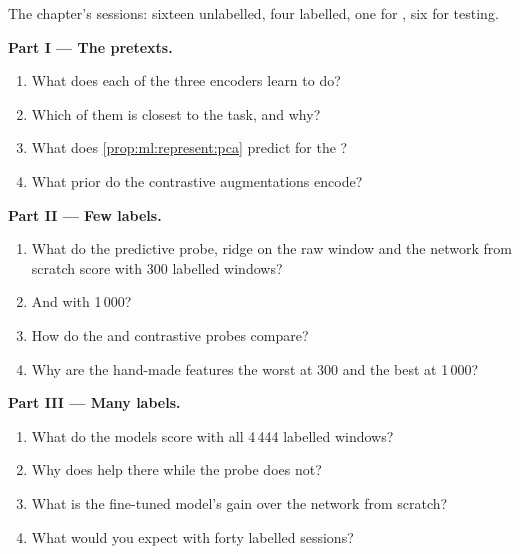 \begin{problem}\label{pb:ml:representation-learning:1}
The chapter's sessions: sixteen unlabelled, four labelled, one for , six for testing.

\medskip\noindent\textbf{Part I --- The pretexts.}
\begin{enumerate}
\item What does each of the three encoders learn to do?
\item Which of them is closest to the task, and why?
\item What does \cref{prop:ml:represent:pca} predict for the ?
\item What prior do the contrastive augmentations encode?
\end{enumerate}

\medskip\noindent\textbf{Part II --- Few labels.}
\begin{enumerate}[resume]
\item What do the predictive probe, ridge on the raw window and the network from scratch score with 300 labelled windows?
\item And with 1\,000?
\item How do the  and contrastive probes compare?
\item Why are the hand-made features the worst at 300 and the best at 1\,000?
\end{enumerate}

\medskip\noindent\textbf{Part III --- Many labels.}
\begin{enumerate}[resume]
\item What do the models score with all 4\,444 labelled windows?
\item Why does  help there while the probe does not?
\item What is the fine-tuned model's gain over the network from scratch?
\item What would you expect with forty labelled sessions?
\end{enumerate}


\end{problem}
